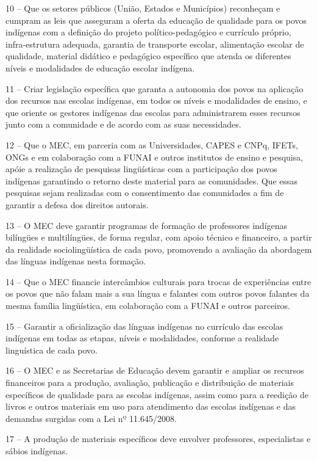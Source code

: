 \documentclass[
]{book}
\begin{document}
10 -- Que os setores públicos (União, Estados e Municípios) reconheçam e cumpram as leis que asseguram a oferta da educação de qualidade para os povos indígenas com a definição do projeto político-pedagógico e currículo próprio, infra-estrutura adequada, garantia de transporte escolar, alimentação escolar de qualidade, material didático e pedagógico específico que atenda os diferentes níveis e modalidades de educação escolar indígena.

11 -- Criar legislação específica que garanta a autonomia dos povos na aplicação dos recursos nas escolas indígenas, em todos os níveis e modalidades de ensino, e que oriente os gestores indígenas das escolas para administrarem esses recursos junto com a comunidade e de acordo com as suas necessidades.

12 -- Que o MEC, em parceria com as Universidades, CAPES e CNPq, IFETs, ONGs e em colaboração com a FUNAI e outros institutos de ensino e pesquisa, apóie a realização de pesquisas lingüísticas com a participação dos povos indígenas garantindo o retorno deste material para as comunidades. Que essas pesquisas sejam realizadas com o consentimento das comunidades a fim de garantir a defesa dos direitos autorais.

13 -- O MEC deve garantir programas de formação de professores indígenas bilíngües e multilíngües, de forma regular, com apoio técnico e financeiro, a partir da realidade sociolingüística de cada povo, promovendo a avaliação da abordagem das línguas indígenas nesta formação.

14 -- Que o MEC financie intercâmbios culturais para trocas de experiências entre os povos que não falam mais a sua língua e falantes com outros povos falantes da mesma família lingüística, em colaboração com a FUNAI e outros parceiros.

15 -- Garantir a oficialização das línguas indígenas no currículo das escolas indígenas em todas as etapas, níveis e modalidades, conforme a realidade linguística de cada povo.

16 -- O MEC e as Secretarias de Educação devem garantir e ampliar os recursos financeiros para a produção, avaliação, publicação e distribuição de materiais específicos de qualidade para as escolas indígenas, assim como para a reedição de livros e outros materiais em uso para atendimento das escolas indígenas e das demandas surgidas com a Lei nº 11.645/2008.

17 -- A produção de materiais específicos deve envolver professores, especialistas e sábios indígenas.
\end{document}
